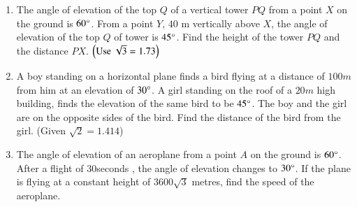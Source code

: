 \begin{enumerate}
\hfill{}\item The angle of elevation of the top $Q$ of a vertical tower $PQ$ from a point $X$ on the ground is $ 60\degree $. From a point $Y$, $40$ m vertically above $X$, the angle of elevation of the top $Q$ of tower is $ 45 \degree $. Find the height of the tower $PQ$ and the distance $PX$. $\left(\text{Use }\sqrt{3} = 1.73\right)$\\
\hfill{}
\item A boy standing on a horizontal plane finds a bird flying at a distance of $100 m$ from him at an elevation of $30\degree$. A girl standing on the roof of a $20 m$ high building, finds the elevation of the same bird to be $45\degree$. The boy and the girl are on the opposite sides of the bird. Find the distance of the bird from the girl. (Given ${\sqrt 2}= 1.414$)

\hfill{}\item The angle of elevation of an aeroplane from a point $A$ on the ground is $60\degree$. After a flight of $30 $seconds , the angle of elevation changes to $30\degree$. If the plane is flying at a constant height of $3600\sqrt 3 $ metres, find the speed of the aeroplane.


\end{enumerate}
